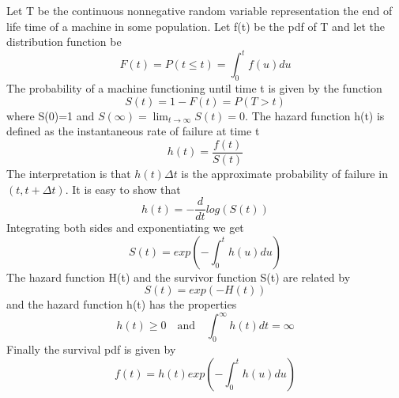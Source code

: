 \documentclass[english]{article}
\numberwithin{equation}{section}
\begin{document}
Let T be the continuous nonnegative random variable representation the end of life time of a machine in some population.  Let f(t) be the pdf of T and let the distribution function be
\begin{equation}
F(t) = P( t \le t) = \int_0^t f(u) du
\end{equation}
The probability of a machine functioning until time t is given by the function
\begin{equation}
S(t) = 1 - F(t)=P(T>t)
\end{equation}
where S(0)=1 and $S(\infty)=\lim_{t \rightarrow \infty} S(t)=0$.  The hazard function h(t) is defined as the instantaneous rate of failure at time t
\begin{equation}
h(t)=\frac{f(t)}{S(t)}
\end{equation}
The interpretation is that $h(t)\Delta t$ is the approximate probability of failure in $(t, t+\Delta t)$.  It is easy to show that
\begin{equation}
h(t)=-\frac{d}{dt}log(S(t))
\end{equation}
Integrating both sides and exponentiating we get
\begin{equation}
S(t)=exp(-\int_0^t h(u) du)
\end{equation}
The hazard function H(t) and the survivor function S(t) are related by
\begin{equation}
S(t)=exp(-H(t))
\end{equation}
and the hazard function h(t) has the properties
\begin{equation}
h(t) \ge 0 \quad  \text{and} \quad  \int_0^\infty h(t)dt = \infty
\end{equation}
Finally the survival pdf is given by
\begin{equation}
f(t)=h(t)exp(-\int_0^t h(u) du)
\end{equation}
\end{document}
